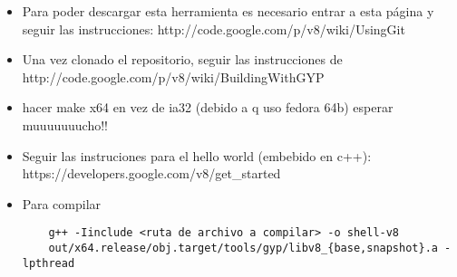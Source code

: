 \begin{itemize}
 \item Para poder descargar esta herramienta es necesario entrar a esta página y seguir las instrucciones:
		http://code.google.com/p/v8/wiki/UsingGit
 \item  Una vez clonado el repositorio, seguir las instrucciones de 
	  http://code.google.com/p/v8/wiki/BuildingWithGYP
 \item 	hacer make x64 en vez de ia32 (debido a q uso fedora 64b) esperar muuuuuuucho!!
 \item  Seguir las instruciones para el hello world (embebido en c++): 
	  https://developers.google.com/v8/get\_started
 \item Para compilar
 \begin{verbatim}
    g++ -Iinclude <ruta de archivo a compilar> -o shell-v8 
    out/x64.release/obj.target/tools/gyp/libv8_{base,snapshot}.a -lpthread
 \end{verbatim}

 
\end{itemize}
